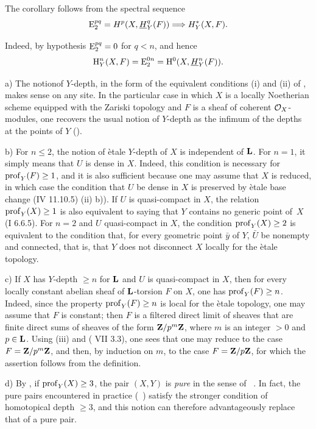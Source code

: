 The corollary follows from the spectral sequence
$$
\operatorname{E}_2^{pq}=H^p(X, {\mathop{\underline{H}}\nolimits}_Y^q(F))\Longrightarrow H_Y^*(X, F).
$$

Indeed, by hypothesis $\operatorname{E}_2^{pq}=0$ for $q<n$, and hence
$$
\mathrm H_Y^n(X, F)=\operatorname{E}_2^{0n}=\mathrm H^0(X, {\mathop{\underline{H}}\nolimits}_Y^n(F)).
$$

\skpt
\begin{remarques} \label{XIV.1.6}
a) The notion\pageoriginale of $Y$-depth, in the form of the equivalent conditions \textup{(i)} and \textup{(ii)} of , makes sense on any site. In the particular case in which $X$ is a locally Noetherian scheme equipped with the Zariski topology and $F$ is a sheaf of coherent $\mathcal O_X$-modules, one recovers the usual notion of $Y$-depth as the infimum of the depths at the points of $Y$ ().

b) For $n\leq 2$, the notion of \`etale $Y$-depth of $X$ is independent of $\mathbf L$. For $n=1$, it simply means that $U$ is dense in $X$. Indeed, this condition is necessary for $\operatorname{prof}_Y(F)\geq 1$, and it is also sufficient because one may assume that $X$ is reduced, in which case the condition that $U$ be dense in $X$ is preserved by \`etale base change \textup{(\EGA IV 11.10.5) \textup{(ii)} b))}. If $U$ is quasi-compact in $X$, the relation $\operatorname{prof}_Y(X)\geq 1$ is also equivalent to saying that $Y$ contains no generic point of~$X$ (\EGA I 6.6.5). For $n=2$ and $U$ quasi-compact in $X$, the condition $\operatorname{prof}_Y(X)\geq 2$ is equivalent to the condition that, for every geometric point $\bar y$ of $Y$, $\bar U$ be nonempty and connected, that is, that \og $Y$ does not disconnect $X$ locally for the \`etale topology\fg.

c) If $X$ has $Y$-depth $\geq n$ for $\mathbf L$ and $U$ is quasi-compact in $X$, then for every locally constant abelian sheaf of $\mathbf L$-torsion $F$ on $X$, one has $\operatorname{prof}_Y(F)\geq n$. Indeed, since the property $\operatorname{prof}_Y(F)\geq n$ is local for the \`etale topology, one may assume that $F$ is constant; then $F$ is a filtered direct limit of sheaves that are finite direct sums of sheaves of the form $\mathbf Z/p^m\mathbf Z$, where $m$ is an integer $>0$ and $p\in \mathbf L$. Using  \textup{(iii)} and \textup{( VII 3.3)}, one sees that one may reduce to the case $F=\mathbf Z/p^m\mathbf Z$, and then\pageoriginale, by induction on $m$, to the case $F=\mathbf Z/p\mathbf Z$, for which the assertion follows from the definition.

d) By , if $\operatorname{prof}_Y(X)\geq 3$, the pair $(X, Y)$ is \textit{pure} in the sense of ~. In fact, the pure pairs encountered in practice (\cf {}~) satisfy the stronger condition of homotopical depth $\geq 3$, and this notion can therefore advantageously replace that of a pure pair.


\end{remarques}
